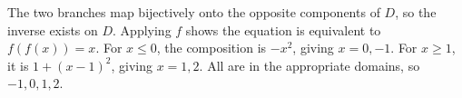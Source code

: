 The two branches map bijectively onto the opposite components of $D$, so the inverse exists on $D$. Applying $f$ shows the equation is equivalent to $f(f(x))=x$. For $x\le0$, the composition is $-x^2$, giving $x=0,-1$. For $x\ge1$, it is $1+(x-1)^2$, giving $x=1,2$. All are in the appropriate domains, so $\boxed{-1,0,1,2}$.
